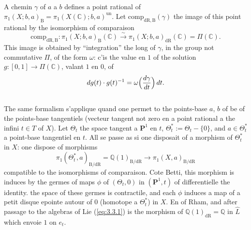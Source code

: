 \documentclass[11pt,a4paper]{article}
\theoremstyle{plain}
\theoremstyle{definition}
\newcommand{\Q}{\mathbb{Q}}
\newcommand{\C}{\mathbb{C}}
\newcommand{\dR}{\mathrm{dR}}
\newcommand{\B}{\mathrm{B}}
\newcommand{\comp}{\mathrm{comp}}
\begin{document}
\subsection{}\label{ssec:3.2}

A chemin $\gamma$ of $a$ a $b$ defines a point rational of $\pi_1(X;b,a)_{\B} = \pi_1(X(\C);b,a)^{\mathrm{un}}$. Let $\comp_{\dR,\B}(\gamma)$ the image of this point rational by the isomorphism of comparaison
\[
\comp_{\dR,\B} : \pi_1(X;b,a)_{\B}(\C) \xrightarrow{\sim} \pi_1(X;b,a)_{\dR}(\C) = \Pi(\C).
\]
This image is obtained by ``integration'' the long of $\gamma$, in the group not commutative $\Pi$, of the form $\omega$: c'is the value en $1$ of the solution $g: [0,1] \to \Pi(\C)$, valant $1$ en $0$, of
\begin{equation}\label{eq:3.2.1}
dg(t) \cdot g(t)^{-1} = \omega\Bigl(\frac{d\gamma}{dt}\Bigr)\,dt.
\end{equation}

\subsection{}\label{ssec:3.3}

The same formalism s'applique quand one permet to the points-base $a$, $b$ of be of the points-base tangentiels (vecteur tangent not zero en a point rational a the infini $t \in T$ of $X$). Let $\Theta_t$ the space tangent a $\mathbf{P}^1$ en $t$, $\Theta_t^* := \Theta_t - \{0\}$, and $a \in \Theta_t^*$ a point-base tangentiel en $t$. All se passe as si one disposait of a morphism of $\Theta_t^*$ in $X$: one dispose of morphisms
\begin{equation}\label{eq:3.3.1}
\pi_1(\Theta_t^*,a)_{\B/\dR} = \Q(1)_{\B/\dR} \to \pi_1(X,a)_{\B/\dR}
\end{equation}
compatible to the isomorphisms of comparaison. Cote Betti, this morphism is induces by the germes of maps $\phi$ of $(\Theta_t,0)$ in $(\mathbf{P}^1,t)$ of differentielle the identity. the space of these germes is contractile, and each $\phi$ induces a map of a petit disque epointe autour of $0$ (homotope a $\Theta_t^*$) in $X$. En of Rham, and after passage to the algebras of Lie (\ref{eq:3.3.1}) is the morphism of $\Q(1)_{\dR} = \Q$ in $\hat{L}$ which envoie $1$ on $e_t$.

\subsection{}\label{ssec:3.4}
\end{document}
